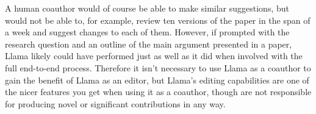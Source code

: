 A human coauthor would of course be able to make similar suggestions, but would
not be able to, for example, review ten versions of the paper in the span of a
week and suggest changes to each of them. However, if prompted with the research
question and an outline of the main argument presented in a paper, Llama likely
could have performed just as well as it did when involved with the full
end-to-end process. Therefore it isn't necessary to use Llama as a coauthor to 
gain the benefit of Llama as an editor, but Llama's editing capabilities are
one of the nicer features you get when using it as a coauthor, though are not 
responsible for producing novel or significant contributions in any way.
